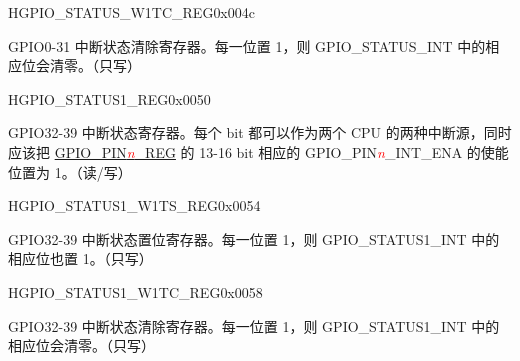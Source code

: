 \begin{register}{H}{GPIO\_STATUS\_W1TC\_REG}{0x004c}\label{regdesc:GPIOSTATUSW1TCREG}
%
\regnewline%
\begin{regdesc}\begin{reglist}
\item [GPIO\_STATUS\_INT\_W1TC]GPIO0-31 中断状态清除寄存器。每一位置 1，则 GPIO\_STATUS\_INT 中的相应位会清零。（只写）
\end{reglist}\end{regdesc}
\end{register}


\begin{register}{H}{GPIO\_STATUS1\_REG}{0x0050}\label{regdesc:GPIOSTATUS1REG}
%
%
\regnewline%
\begin{regdesc}\begin{reglist}
\item [GPIO\_STATUS1\_INT]GPIO32-39 中断状态寄存器。每个 bit 都可以作为两个 CPU 的两种中断源，同时应该把 \hyperref[regdesc:GPIOPINnREG]{GPIO\_PIN\textcolor{red}{\it{n}}\_REG} 的 13-16 bit 相应的 GPIO\_PIN\textcolor{red}{\it{n}}\_INT\_ENA 的使能位置为 1。（读/写）
\end{reglist}\end{regdesc}
\end{register}


\begin{register}{H}{GPIO\_STATUS1\_W1TS\_REG}{0x0054}\label{regdesc:GPIOSTATUS1W1TSREG}
%
%
\regnewline%
\begin{regdesc}\begin{reglist}
\item [GPIO\_STATUS1\_INT\_W1TS]GPIO32-39 中断状态置位寄存器。每一位置 1，则 GPIO\_STATUS1\_INT 中的相应位也置 1。（只写）
\end{reglist}\end{regdesc}
\end{register}


\begin{register}{H}{GPIO\_STATUS1\_W1TC\_REG}{0x0058}\label{regdesc:GPIOSTATUS1W1TCREG}
%
%
\regnewline%
\begin{regdesc}\begin{reglist}
\item [GPIO\_STATUS1\_INT\_W1TC]GPIO32-39 中断状态清除寄存器。每一位置 1，则 GPIO\_STATUS1\_INT 中的相应位会清零。（只写）
\end{reglist}\end{regdesc}
\end{register}


